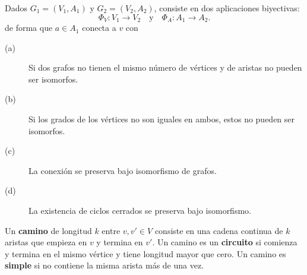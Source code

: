 \begin{fdefinition}[Isomorfismo]
\normalfont Dados $\displaystyle G_{1} = \left(V_{1}, A_{1}\right) $ y $\displaystyle G_{2} = \left(V_{2}, A_{2}\right) $, consiste en dos aplicaciones biyectivas:
\[\Phi_{V}: V_{1} \to V_{2} \quad \text{y} \quad \Phi_{A} : A_{1} \to A_{2} .\]
de forma que $\displaystyle a \in A_{1} $ conecta a $\displaystyle v $ con 
\end{fdefinition}
\begin{fprop}
\normalfont 
\begin{description}
\item[(a)] Si dos grafos no tienen el mismo número de vértices y de aristas no pueden ser isomorfos.
\item[(b)] Si los grados de los vértices no son iguales en ambos, estos no pueden ser isomorfos.
\item[(c)] La conexión se preserva bajo isomorfismo de grafos.
\item[(d)] La existencia de ciclos cerrados se preserva bajo isomorfismo.
\end{description}
\end{fprop}
\begin{fdefinition}[Camino]
\normalfont Un \textbf{camino} de longitud $\displaystyle k $ entre $\displaystyle v, v' \in V $ consiste en una cadena continua de $\displaystyle k $ aristas que empieza en $\displaystyle v $ y termina en $\displaystyle v' $. Un camino es un \textbf{circuito} si comienza y termina en el mismo vértice y tiene longitud mayor que cero. Un camino es \textbf{simple} si no contiene la misma arista más de una vez.  
\end{fdefinition}

